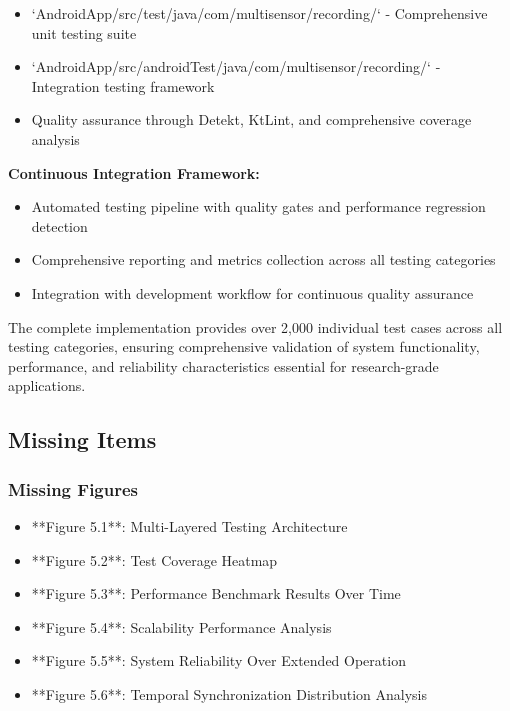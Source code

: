 \documentclass[12pt,a4paper]{article}
\begin{document}
\begin{itemize}
\item `AndroidApp/src/test/java/com/multisensor/recording/` - Comprehensive unit testing suite
\item `AndroidApp/src/androidTest/java/com/multisensor/recording/` - Integration testing framework
\item Quality assurance through Detekt, KtLint, and comprehensive coverage analysis

\end{itemize}
\textbf{Continuous Integration Framework:}

\begin{itemize}
\item Automated testing pipeline with quality gates and performance regression detection
\item Comprehensive reporting and metrics collection across all testing categories
\item Integration with development workflow for continuous quality assurance

\end{itemize}
The complete implementation provides over 2,000 individual test cases across all testing categories, ensuring
comprehensive validation of system functionality, performance, and reliability characteristics essential for
research-grade applications.

\subsection{Missing Items}

\subsubsection{Missing Figures}

\begin{itemize}
\item **Figure 5.1**: Multi-Layered Testing Architecture
\item **Figure 5.2**: Test Coverage Heatmap
\item **Figure 5.3**: Performance Benchmark Results Over Time
\item **Figure 5.4**: Scalability Performance Analysis
\item **Figure 5.5**: System Reliability Over Extended Operation
\item **Figure 5.6**: Temporal Synchronization Distribution Analysis

\end{itemize}
\end{document}
